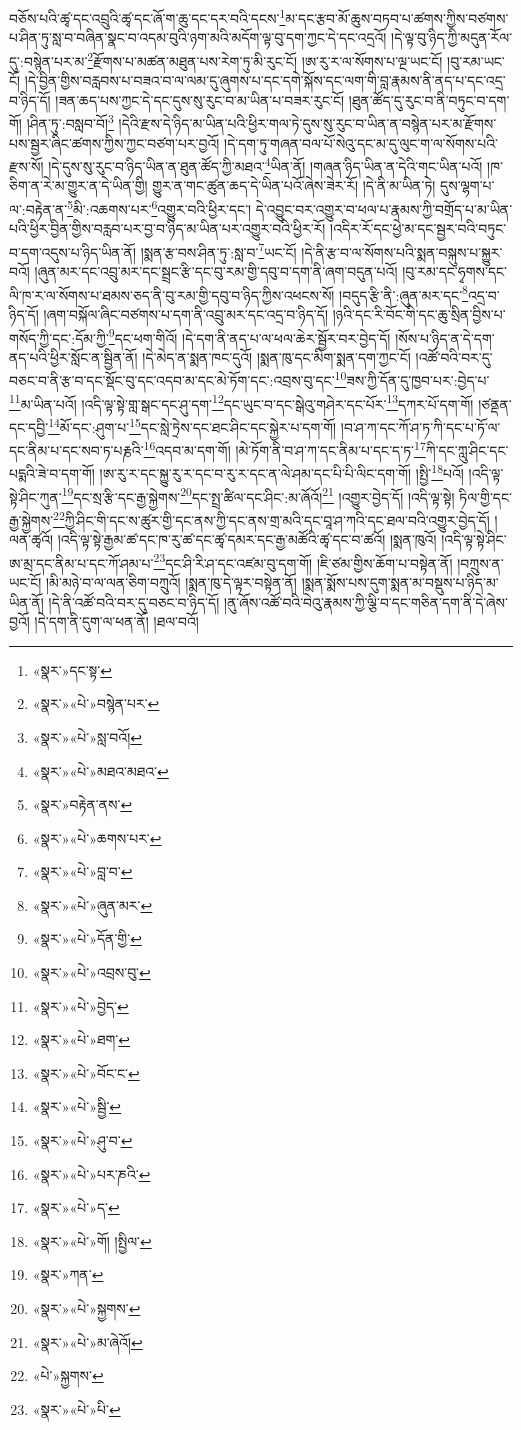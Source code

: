 བཅོས་པའི་ཚྭ་དང་འབྲུའི་ཚྭ་དང་ཞོ་ག་ཆུ་དང་དར་བའི་དངས་\footnote{«སྣར་»དང་སྟ་}མ་དང་རྩབ་མོ་ཆུས་བཏབ་པ་ཚགས་ཀྱིས་བཙགས་པ་ཤིན་ཏུ་སླ་བ་བཞིན་སྣང་བ་འདམ་བུའི་ཉག་མའི་མདོག་ལྟ་བུ་དག་ཀྱང་དེ་དང་འདྲའོ། །དེ་ལྟ་བུ་ཉིད་ཀྱི་མདུན་རོལ་དུ་:བསྙེན་པར་མ་\footnote{«སྣར་»«པེ་»བསྙེན་པར་}རྫོགས་པ་མཚན་མཐུན་པས་རེག་ཏུ་མི་རུང་ངོ། །ཨ་རུ་ར་ལ་སོགས་པ་ལྔ་ཡང་ངོ། །བུ་རམ་ཡང་ངོ། །དེ་བྱིན་གྱིས་བརླབས་པ་བཟའ་བ་ལ་ལམ་དུ་ཞུགས་པ་དང་དགེ་སྐོས་དང་ལག་གི་བླ་རྣམས་ནི་ནད་པ་དང་འདྲ་བ་ཉིད་དོ། །ཟན་ཆད་པས་ཀྱང་དེ་དང་དུས་སུ་རུང་བ་མ་ཡིན་པ་བཟར་རུང་ངོ། །ཐུན་ཚོད་དུ་རུང་བ་ནི་བཏུང་བ་དག་གོ། །ཤིན་ཏུ་:བསླབ་བོ།\footnote{«སྣར་»«པེ་»སླ་བའོ།} །དེའི་རྫས་དེ་ཉིད་མ་ཡིན་པའི་ཕྱིར་གལ་ཏེ་དུས་སུ་རུང་བ་ཡིན་ན་བསྙེན་པར་མ་རྫོགས་པས་སྦྱར་ཞིང་ཚགས་ཀྱིས་ཀྱང་བཙག་པར་བྱའོ། །དེ་དག་ཏུ་གཞན་བལ་པོ་སེའུ་དང་མ་དུ་ལུང་ག་ལ་སོགས་པའི་རྫས་སོ། །དེ་དུས་སུ་རུང་བ་ཉིད་ཡིན་ན་ཐུན་ཚོད་ཀྱི་མཐའ་\footnote{«སྣར་»«པེ་»མཐའ་མཐའ་}ཡིན་ནོ། །གཞན་ཉིད་ཡིན་ན་དེའི་གང་ཡིན་པའོ། །ཁ་ཅིག་ན་རེ་མ་གྱུར་ན་དེ་ཡིན་གྱི། གྱུར་ན་གང་ཚུན་ཆད་དེ་ཡིན་པའོ་ཞེས་ཟེར་རོ། །དེ་ནི་མ་ཡིན་ཏེ། དུས་ལྷག་པ་ལ་:བརྟེན་ན་\footnote{«སྣར་»བརྟེན་ནས་}མི་:འཆགས་པར་\footnote{«སྣར་»«པེ་»ཆགས་པར་}འགྱུར་བའི་ཕྱིར་དང་། དེ་འབྱུང་བར་འགྱུར་བ་ཕལ་པ་རྣམས་ཀྱི་བགྲོད་པ་མ་ཡིན་པའི་ཕྱིར་བྱིན་གྱིས་བརླབ་པར་བྱ་བ་ཉིད་མ་ཡིན་པར་འགྱུར་བའི་ཕྱིར་རོ། །འདིར་རོ་དང་ཕྱེ་མ་དང་སྦྱར་བའི་བཏུང་བ་དག་འདུས་པ་ཉིད་ཡིན་ནོ། །སྨན་རྩ་བས་ཤིན་ཏུ་:སླ་བ་\footnote{«སྣར་»«པེ་»བླ་བ་}ཡང་ངོ། །དེ་ནི་རྩ་བ་ལ་སོགས་པའི་སྨན་བསྐུས་པ་སྐྱུར་བའོ། །ཞུན་མར་དང་འབྲུ་མར་དང་སྦྲང་རྩི་དང་བུ་རམ་གྱི་དབུ་བ་དག་ནི་ཞག་བདུན་པའོ། །བུ་རམ་དང་ཧྭགས་དང་ལི་ཁ་ར་ལ་སོགས་པ་ཐམས་ཅད་ནི་བུ་རམ་གྱི་དབུ་བ་ཉིད་ཀྱིས་འཕངས་སོ། །བདུད་རྩི་ནི་:ཞུན་མར་དང་\footnote{«སྣར་»«པེ་»ཞུན་མར་}འདྲ་བ་ཉིད་དོ། །ཞག་བསྐོལ་ཞིང་བཙགས་པ་དག་ནི་འབྲུ་མར་དང་འདྲ་བ་ཉིད་དོ། །ཉའི་དང་རི་བོང་གི་དང་ཆུ་སྲིན་བྱིས་པ་གསོད་ཀྱི་དང་:དོམ་ཀྱི་\footnote{«སྣར་»«པེ་»དོན་གྱི་}དང་ཕག་གིའོ། །དེ་དག་ནི་ནད་པ་ལ་ཕལ་ཆེར་སྦྱོར་བར་བྱེད་དོ། །སོས་པ་ཉིད་ན་དེ་དག་ནད་པའི་ཕྱིར་སློང་ན་སྦྱིན་ནོ། །དེ་མེད་ན་སྨན་ཁང་དུའོ། །སྨན་ཁུ་དང་མིག་སྨན་དག་ཀྱང་ངོ། །འཚོ་བའི་བར་དུ་བཅང་བ་ནི་རྩ་བ་དང་སྡོང་བུ་དང་འདབ་མ་དང་མེ་ཏོག་དང་:འབྲས་བུ་དང་\footnote{«སྣར་»«པེ་»འབྲས་བུ་}ཟས་ཀྱི་དོན་དུ་ཁྱབ་པར་:བྱེད་པ་\footnote{«སྣར་»«པེ་»བྱེད་}མ་ཡིན་པའོ། །འདི་ལྟ་སྟེ་གླ་སྒང་དང་ཤུ་དག་\footnote{«སྣར་»«པེ་»ཐག་}དང་ཡུང་བ་དང་སྒེའུ་གཤེར་དང་པོར་\footnote{«སྣར་»«པེ་»བོང་ང་}དཀར་པོ་དག་གོ། །ཙནྡན་དང་དབྱི་\footnote{«སྣར་»«པེ་»སྦྱི་}མོ་དང་:ཤུག་པ་\footnote{«སྣར་»«པེ་»ཤུ་བ་}དང་སླེ་ཏྲེས་དང་ཐང་ཤིང་དང་སྐྱེར་པ་དག་གོ། །བ་ཤ་ཀ་དང་ཀོ་ཤ་ཏ་ཀི་དང་པ་ཏོ་ལ་དང་ནིམ་པ་དང་སབ་ཏ་པརྞའི་\footnote{«སྣར་»«པེ་»པར་ཎའི་}འདབ་མ་དག་གོ། །མེ་ཏོག་ནི་བ་ཤ་ཀ་དང་ནིམ་པ་དང་ད་ཏ་\footnote{«སྣར་»«པེ་»ད་}ཀི་དང་ཀླུ་ཤིང་དང་པདྨའི་ཟེ་བ་དག་གོ། །ཨ་རུ་ར་དང་སྐྱུ་རུ་ར་དང་བ་རུ་ར་དང་ན་ལེ་ཤམ་དང་པི་པི་ལིང་དག་གོ། །སྤྱི་\footnote{«སྣར་»«པེ་»གོ། །སྤྱིལ་}པའོ། །འདི་ལྟ་སྟེ་ཤིང་ཀུན་\footnote{«སྣར་»ཀན་}དང་སྲ་རྩི་དང་རྒྱ་སྐྱེགས་\footnote{«སྣར་»«པེ་»སྐྱགས་}དང་སྤྲ་ཚིལ་དང་ཤིང་:མ་ཞོའོ།\footnote{«སྣར་»«པེ་»མ་ཞེའོ།} །འགྱུར་བྱེད་དོ། །འདི་ལྟ་སྟེ། ཏིལ་གྱི་དང་རྒྱ་སྐྱེགས་\footnote{«པེ་»སྐྱགས་}ཀྱི་ཤིང་གི་དང་ས་ཚུར་གྱི་དང་ནས་ཀྱི་དང་ནས་གྲ་མའི་དང་བཱ་ཤ་ཀའི་དང་ཐལ་བའི་འགྱུར་བྱེད་དོ། །ལན་ཚྭའོ། །འདི་ལྟ་སྟེ་རྒྱམ་ཚ་དང་ཁ་རུ་ཚ་དང་ཚྭ་དམར་དང་རྒྱ་མཚོའི་ཚྭ་དང་བ་ཚའོ། །སྨན་ཁུའོ། །འདི་ལྟ་སྟེ་ཤིང་ཨ་མྲ་དང་ནིམ་པ་དང་ཀོ་ཤམ་པ་\footnote{«སྣར་»«པེ་»པི་}དང་ཤི་རི་ཤ་དང་འཛམ་བུ་དག་གོ། །ཇི་ཙམ་གྱིས་ཆོག་པ་བསྟེན་ནོ། །བཀྲུས་ན་ཡང་ངོ། །མི་མཉེ་བ་ལ་ལན་ཅིག་བཀྲུའོ། །སྨན་ཁུ་དེ་ལྟར་བསྟེན་ནོ། །སྨན་སྨོས་པས་དུག་སྨན་མ་བསྡུས་པ་ཉིད་མ་ཡིན་ནོ། །དེ་ནི་འཚོ་བའི་བར་དུ་བཅང་བ་ཉིད་དོ། །ནུ་ཞོས་འཚོ་བའི་བེའུ་རྣམས་ཀྱི་ལྕི་བ་དང་གཅིན་དག་ནི་དེ་ཞེས་བྱའོ། །དེ་དག་ནི་དུག་ལ་ཕན་ནོ། །ཐལ་བའོ། 
